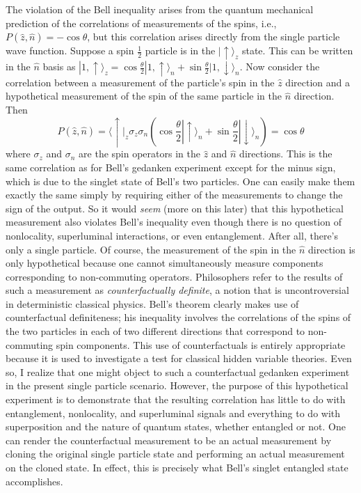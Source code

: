 \documentclass[12pt]{article}
\begin{document}
The violation of the Bell inequality arises from the quantum mechanical prediction of the correlations of measurements of the spins, i.e., $P(\hat{z},\hat{n})=-\cos \theta$, but this correlation arises directly from the single particle wave function.  Suppose a spin $\frac{1}{2}$ particle is in the $|\!\!\uparrow\rangle_z$ state.  This can be written in the $\hat{n}$ basis as $|1,\uparrow \rangle_z = \cos{\frac{\theta}{2}} |1,\uparrow \rangle_n + \sin{\frac{\theta}{2}} |1,\downarrow \rangle_n$.  Now consider the correlation between a measurement of the particle's spin in the $\hat{z}$ direction and a hypothetical measurement of the spin of the same particle in the $\hat{n}$ direction.  Then
\begin{equation}
P(\hat{z},\hat{n}) = \langle \uparrow\!|_z \sigma_z \sigma_n (\cos{\frac{\theta}{2}} \!|\!\!\uparrow \rangle_n + \sin{\frac{\theta}{2}}|\!\downarrow \rangle_n)=\cos\theta
\end{equation}
where $\sigma_{z}$ and $\sigma_{n}$ are the spin operators in the $\hat{z}$ and  $\hat{n}$ directions. 
This is the same correlation as for Bell's gedanken experiment except for the minus sign, which is due to the singlet state of Bell's two particles.  One can easily make them exactly the same simply by requiring either of the measurements to change the sign of the output.  So it would {\it seem} (more on this later) that this hypothetical measurement also violates Bell's inequality even though there is no question of nonlocality, superluminal interactions, or even entanglement.  After all, there's only a single particle.  Of course, the measurement of the spin in the $\hat{n}$ direction is only hypothetical because one cannot simultaneously measure components corresponding to non-commuting operators.  Philosophers refer to the results of such a measurement as {\it counterfactually definite}, a notion that is uncontroversial in deterministic classical physics.  Bell's theorem clearly makes use of counterfactual definiteness; his inequality involves the correlations of the spins of the two particles in each of two different directions that correspond to non-commuting spin components. This use of counterfactuals is entirely appropriate because it is used to investigate a test for classical hidden variable theories.    Even so, I realize that one might object to such a counterfactual gedanken experiment in the present single particle scenario. However, the purpose of this hypothetical experiment is to demonstrate that the resulting correlation has little to do with entanglement, nonlocality, and superluminal signals and everything to do with superposition and the nature of quantum states, whether entangled or not.  One can render the counterfactual measurement to be an actual measurement by cloning the original single particle state and performing an actual measurement on the cloned state.  In effect, this is precisely what Bell's singlet entangled state accomplishes.
\end{document}
